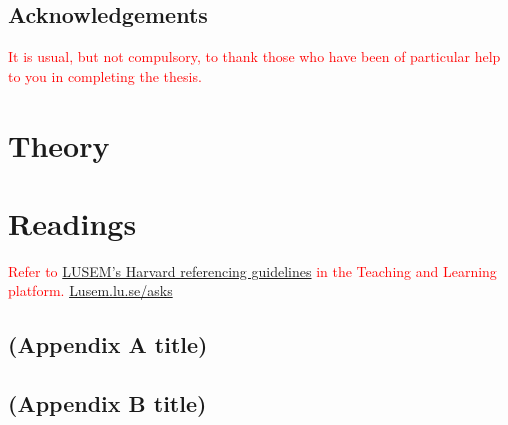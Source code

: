 \documentclass[12pt,twoside]{report}
\newcommand{\mcite}[1]{\textcolor{mycolor}{\citeauthor{#1} (\citeyear{#1})}}
\newcommand{\hcite}[1]{(\textcolor{mycolor}{\citeauthor{#1}, \citeyear{#1}})}
\begin{document}

    


    \chapter*{Acknowledgements}
    \textcolor{red}{It is usual, but not compulsory, to thank those who have been of particular help to you in completing the thesis.}

    {\hypersetup{linkcolor=black}
        \tableofcontents
        \listoffigures
        \listoftables
    }
        {\hypersetup{linkcolor=mycolor}}
     
    \part{Theory}\label{prt:theory}
    
    \part{Readings}\label{prt:theory}
    
    
    
    \vspace{2.0cm}
    \textcolor{red}{Refer to \href{http://libguides.lub.lu.se/plagiarism}{LUSEM’s Harvard referencing guidelines} in the Teaching and Learning platform. \url{Lusem.lu.se/asks}}

    \appendix
    \chapter{(Appendix A title)}
    
     \chapter{(Appendix B title)}
\end{document}

